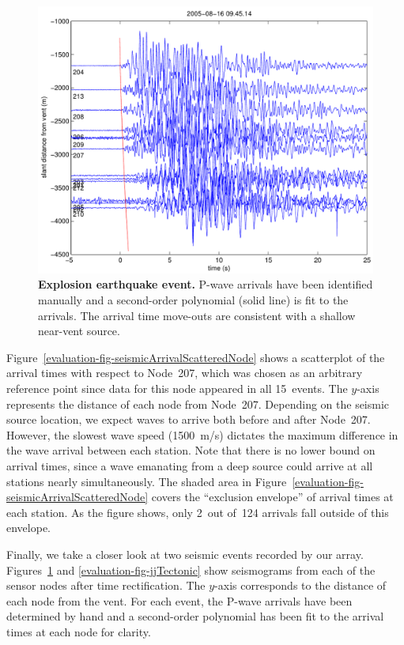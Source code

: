 \begin{figure}[t!]
\begin{center}
\includegraphics[width=0.8\hsize]{./5-evaluation/figs/fidelity/seismicArrival/johnson/2005-08-16_09-45-14.pdf}
\end{center}
\caption{\textbf{Explosion earthquake event.}
P-wave arrivals have been identified manually and a second-order polynomial
(solid line) is fit to the arrivals. The arrival time move-outs are
consistent with a shallow near-vent source.}
\label{evaluation-fig-jjExplosion}
\end{figure}

Figure~\ref{evaluation-fig-seismicArrivalScatteredNode} shows a scatterplot
of the arrival times with respect to Node~207, which was chosen as an
arbitrary reference point since data for this node appeared in all 15~events.
The $y$-axis represents the distance of each node from Node~207. Depending on
the seismic source location, we expect waves to arrive both before and after
Node~207. However, the slowest wave speed (1500~m/s) dictates the maximum
difference in the wave arrival between each station. Note that there is no
lower bound on arrival times, since a wave emanating from a deep source could
arrive at all stations nearly simultaneously. The shaded area in
Figure~\ref{evaluation-fig-seismicArrivalScatteredNode} covers the
``exclusion envelope'' of arrival times at each station. As the figure shows,
only 2~out of~124 arrivals fall outside of this envelope.

Finally, we take a closer look at two seismic events recorded by our array.
Figures~\ref{evaluation-fig-jjExplosion} and \ref{evaluation-fig-jjTectonic}
show seismograms from each of the sensor nodes after time rectification. The
$y$-axis corresponds to the distance of each node from the vent. For each
event, the P-wave arrivals have been determined by hand and a second-order
polynomial has been fit to the arrival times at each node for clarity.

